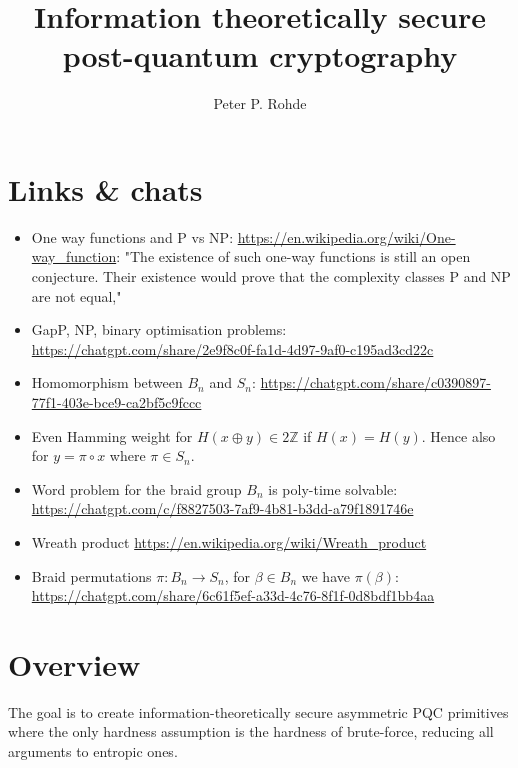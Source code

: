 \documentclass[twocolumn, aps, amsmath, amssymb, nofootinbib, superscriptaddress, longbibliography, doublefloatfix, table-of-contents, eqsecnum, rmp]{revtex4-2}
\begin{document}
\title{Information theoretically secure post-quantum cryptography}

\author{Peter P. Rohde}

\begin{abstract}
\end{abstract}

\maketitle

\tableofcontents

\section{Links \& chats}

\begin{itemize}
	\item One way functions and P vs NP: \url{https://en.wikipedia.org/wiki/One-way_function}: "The existence of such one-way functions is still an open conjecture. Their existence would prove that the complexity classes P and NP are not equal,"
	\item GapP, NP, binary optimisation problems: \url{https://chatgpt.com/share/2e9f8c0f-fa1d-4d97-9af0-c195ad3cd22c}
	\item Homomorphism between $B_n$ and $S_n$: \url{https://chatgpt.com/share/c0390897-77f1-403e-bce9-ca2bf5c9fccc}
	\item Even Hamming weight for $H(x\oplus y)\in 2\mathbb{Z}$ if $H(x)=H(y)$. Hence also for $y=\pi\circ x$ where $\pi\in S_n$.
	\item Word problem for the braid group $B_n$ is poly-time solvable: \url{https://chatgpt.com/c/f8827503-7af9-4b81-b3dd-a79f1891746e}
	\item Wreath product \url{https://en.wikipedia.org/wiki/Wreath_product}
	\item Braid permutations \mbox{$\pi: B_n \to S_n$}, for $\beta\in B_n$ we have $\pi(\beta)$: \url{https://chatgpt.com/share/6c61f5ef-a33d-4c76-8f1f-0d8bdf1bb4aa}
\end{itemize}

\section{Overview}

The goal is to create information-theoretically secure asymmetric PQC primitives where the only hardness assumption is the hardness of brute-force, reducing all arguments to entropic ones.
\end{document}
